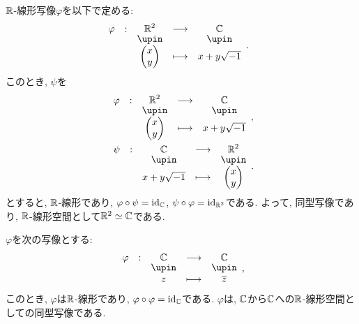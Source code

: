 \begin{example}
  $\mathbb{R}$-線形写像$\varphi$を以下で定める:
  \begin{align*}
    &\shazo{\varphi}{\RR^2}{\CC}{\begin{pmatrix}x\\y\end{pmatrix}}{x+y\sqrt{-1}}.
  \end{align*}
  このとき,
  $\psi$を
  \begin{align*}
    &\shazo{\varphi}{\RR^2}{\CC}{\begin{pmatrix}x\\y\end{pmatrix}}{x+y\sqrt{-1}},\\
   &\shazo{\psi}{\CC}{\RR^2}{x+y\sqrt{-1}}{\begin{pmatrix}x\\y\end{pmatrix}}.
  \end{align*}
  とすると,
  $\mathbb{R}$-線形であり,
  $\varphi\circ \psi=\operatorname{id}_{\mathbb{C}}$,
  $\psi\circ\varphi=\operatorname{id}_{\mathbb{R}^2}$である.
  よって, 同型写像であり,
  $\mathbb{R}$-線形空間として$\mathbb{R}^2\simeq\mathbb{C}$である.
\end{example}

\begin{example}
  $\varphi$を次の写像とする:
  \begin{align*}
    \shazo{\varphi}{\CC}{\CC}{z}{\overline{z}},
  \end{align*}
  このとき, $\varphi$は$\mathbb{R}$-線形であり, $\varphi\circ\varphi=\operatorname{id}_{\mathbb{C}}$である.
  $\varphi$は, $\mathbb{C}$から$\mathbb{C}$への$\mathbb{R}$-線形空間としての同型写像である.
\end{example}


